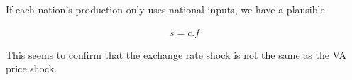 \documentclass[11pt,a4paper]{article}
\begin{document}
If each nation's production only uses national inputs, we have a plausible

\begin{gather*}
\bar{s}=c.f
\end{gather*}

This seems to confirm that the exchange rate shock is not the same as the VA price shock.
\end{document}
